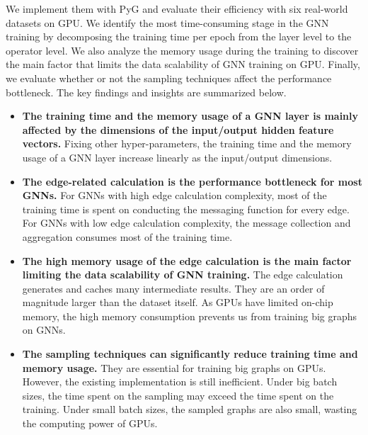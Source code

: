 We implement them with PyG and evaluate their efficiency with six real-world datasets on GPU.
We identify the most time-consuming stage in the GNN training by decomposing the training time per epoch from the layer level to the operator level.
We also analyze the memory usage during the training to discover the main factor that limits the data scalability of GNN training on GPU. 
Finally, we evaluate whether or not the sampling techniques affect the performance bottleneck. 
The key findings and insights are summarized below.

\begin{itemize}
    \item \textbf{The training time and the memory usage of a GNN layer is mainly affected by the dimensions of the input/output hidden feature vectors.}
    Fixing other hyper-parameters, the training time and the memory usage of a GNN layer increase linearly as the input/output dimensions.
    \item \textbf{The edge-related calculation is the performance bottleneck for most GNNs.}
    For GNNs with high edge calculation complexity, most of the training time is spent on conducting the messaging function for every edge. 
    For GNNs with low edge calculation complexity, the message collection and aggregation consumes most of the training time.
    \item \textbf{The high memory usage of the edge calculation is the main factor limiting the data scalability of GNN training.}
    The edge calculation generates and caches many intermediate results. 
    They are an order of magnitude larger than the dataset itself. 
    As GPUs have limited on-chip memory, the high memory consumption prevents us from training big graphs on GNNs.
    \item \textbf{The sampling techniques can significantly reduce training time and memory usage.}
    They are essential for training big graphs on GPUs. 
    However, the existing implementation is still inefficient. 
    Under big batch sizes, the time spent on the sampling may exceed the time spent on the training. 
    Under small batch sizes, the sampled graphs are also small, wasting the computing power of GPUs.
\end{itemize}

